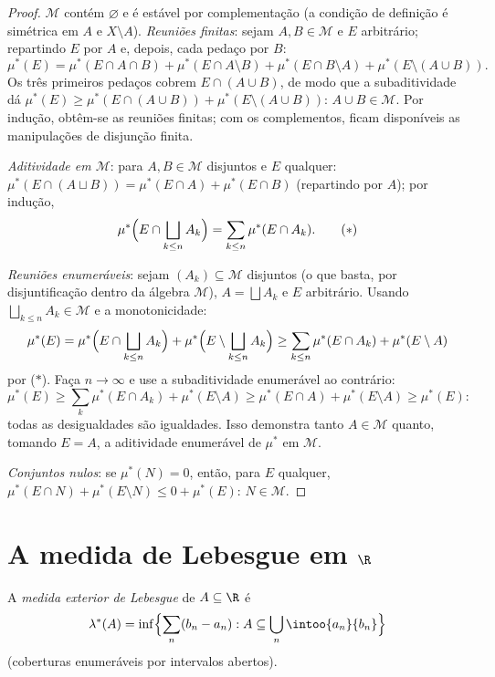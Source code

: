 \begin{proof}
$\mathcal M$ contém $\varnothing$ e é estável por complementação (a condição de
definição é simétrica em $A$ e $X\setminus A$). \emph{Reuniões finitas}:
sejam $A, B \in \mathcal
M$ e $E$ arbitrário; repartindo $E$ por $A$ e,
depois, cada pedaço por $B$:
\[
\mu^*(E) = \mu^*(E\cap A\cap B) + \mu^*(E\cap A\setminus B) +
\mu^*(E\cap B\setminus A) + \mu^*(E\setminus(A\cup B)).
\]
Os três primeiros pedaços cobrem $E \cap (A \cup B)$, de modo que a subaditividade dá
$\mu^*(E) \geq \mu^*(E\cap(A\cup B)) +
\mu^*(E\setminus(A\cup B))$: $A \cup B \in \mathcal M$. Por indução, obtêm-se as reuniões finitas; com os
complementos, ficam disponíveis as manipulações de disjunção finita.

\emph{Aditividade em $\mathcal M$}: para $A, B \in
\mathcal M$ disjuntos e $E$ qualquer:
$\mu^*(E\cap(A\sqcup B)) = \mu^*(E\cap
A) + \mu^*(E \cap B)$ (repartindo por $A$); por indução,
\[
\mu^*\Bigl(E \cap \bigsqcup_{k\leq n}A_k\Bigr)
= \sum_{k\leq n}\mu^*(E\cap A_k).
\tag{$*$}
\]

\emph{Reuniões enumeráveis}: sejam $(A_k) \subseteq \mathcal M$ disjuntos (o que basta, por
disjuntificação dentro da álgebra $\mathcal M$), $A = \bigsqcup A_k$ e $E$ arbitrário.
Usando $\bigsqcup_{k\leq n}A_k \in \mathcal M$ e a monotonicidade:
\[
\mu^*(E) = \mu^*\Bigl(E\cap\bigsqcup_{k\leq n}A_k\Bigr) +
\mu^*\Bigl(E\setminus\bigsqcup_{k\leq n}A_k\Bigr)
\geq \sum_{k \leq n}\mu^*(E\cap A_k) + \mu^*(E\setminus A)
\]
por ($*$). Faça $n \to \infty$ e use a subaditividade enumerável ao
contrário:
\[
\mu^*(E) \geq \sum_{k}\mu^*(E\cap A_k) + \mu^*(E\setminus A)
\geq \mu^*(E \cap A) + \mu^*(E\setminus A) \geq \mu^*(E):
\]
todas as desigualdades são igualdades. Isso demonstra tanto $A \in
\mathcal M$ quanto,
tomando $E = A$, a aditividade enumerável de $\mu^*$ em $\mathcal M$.

\emph{Conjuntos nulos}: se $\mu^*(N) = 0$, então, para $E$ qualquer, $\mu^*(E \cap N) + \mu^*(E\setminus N) \leq 0 + \mu^*(E)$:
$N \in \mathcal M$.
\end{proof}

\section{A medida de Lebesgue em \texorpdfstring{$\R$}{R}}

\begin{definition}\label{def:b3:measure:lebesgueouter}
A \emph{medida exterior de Lebesgue} de $A
\subseteq \R$
é
\[
\lambda^*(A) = \inf\Bigl\{\sum_{n} (b_n - a_n) :
A \subseteq \bigcup_n \intoo{a_n}{b_n}\Bigr\}
\]
(coberturas enumeráveis por intervalos abertos).
\end{definition}

